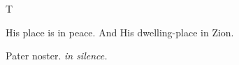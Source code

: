 ﻿%
\bigskip\bigskip{}
\def\matinsnocturn{3rd Nocturn}
%
\large
\def\preant{\setgrefactor{17}\large}
\def\prepsalm{\normalsize}
\def\anttranslation{God is my helper, and the Lord is the protector of my soul.}
\def\psalmtranslationsmall{T}
\let\prepsalm=\undefined
%
\printseparation
{
\def\preant{\setgrefactor{17}\large}
\def\prepsalm{\normalsize}
\def\psalmtranslationsmall{T}
\def\anttranslation{His place is in peace and His dwelling-place in Zion.}
\def\lalinebreakafterthree\undefined{T}
\let\prepsalm=\undefined
}
%
\printseparation{}
{
\def\preant{\setgrefactor{17}\large}
\def\psalmtranslationsmall{T}
\def\anttranslation{I am become as a man without help, free among the dead.}
\def\lalinebreakafterseven{T}
}

\bigskip\bigskip
{}
{His place is in peace.}
{And His dwelling-place in Zion.}

\bigskip
Pater noster. \emph{in silence.}

